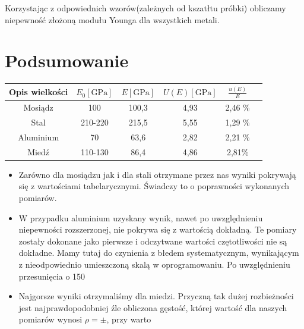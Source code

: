 \documentclass [a4paper,11pt]{article}
\begin{document}
	Korzystając z odpowiednich wzorów(zależnych od kszatłtu próbki) obliczamy niepewność złożoną modułu Younga dla wszystkich metali. 

		

	\section{Podsumowanie}
	\begin{center}
		\begin{tabular}{|c|c|c|c|c|c|}
			\hline Opis wielkości & $ E_0 \left[ \text{GPa} \right]$ & $E \left[ \text{GPa} \right]$ & $U(E) \left[ \text{GPa} \right]$ & $ \frac{u(E)}{E} $\\
			\hline Mosiądz  & 100 &  100,3& 4,93 & 2,46 \%  \\
			\hline Stal & 210-220 & 215,5 & 5,55 & 1,29 \%  \\  
			\hline Aluminium& 70 &  63,6&2,82  &  2,21 \%  \\ 
			\hline  Miedź& 110-130 & 86,4  &  4,86 & 2,81\% \\ 
			\hline 
		\end{tabular} 
	\end{center}
\vspace{1em}

\begin{itemize}
	\item Zarówno dla mosiądzu jak i dla stali otrzymane przez nas wyniki pokrywają się z wartościami tabelarycznymi. Świadczy to o poprawności wykonanych pomiarów.
	
	\item W przypadku aluminium uzyskany wynik, nawet po uwzględnieniu niepewności rozszerzonej, nie pokrywa się z wartością dokładną. Te pomiary zostały dokonane jako pierwsze i odczytwane wartości czętotliwości nie są dokładne. Mamy tutaj do czynienia z błedem systematycznym, wynikającym z nieodpowiednio umieszczoną skalą w oprogramowaniu. Po uwzględnieniu przesunięcia o 150 
	
	\item Najgorsze wyniki otrzymaliśmy dla miedzi. Przyczną tak dużej rozbieżności jest najprawdopodobniej źle obliczona gęstość, której wartość dla naszych pomiarów wynosi $\rho=\pm$, przy warto
\end{itemize}
\end{document}
